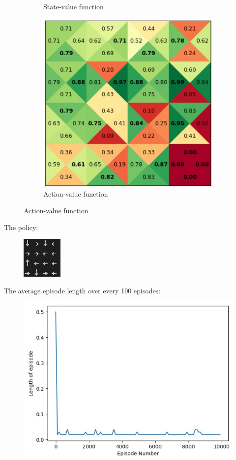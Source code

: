 \documentclass{article}
\begin{document}
\begin{enumerate}
\begin{figure}[H]
\begin{subfigure}[b]{0.5\linewidth}
		\caption{State-value function}
	\end{subfigure}
	\begin{subfigure}[b]{0.5\linewidth}
		\includegraphics[width = \linewidth]{QQ2.jpg}
		\caption{Action-value function}
	\end{subfigure}
\end{figure}
The policy:
\begin{figure}[H]
	\centering
	\includegraphics{QPolicy2.jpg}
\end{figure}
The average episode length over every 100 episodes:
\begin{figure}[H]
	\centering
	\includegraphics[scale = 0.5]{QPlot2.jpg}

\end{figure}
\end{enumerate}
\end{document}
